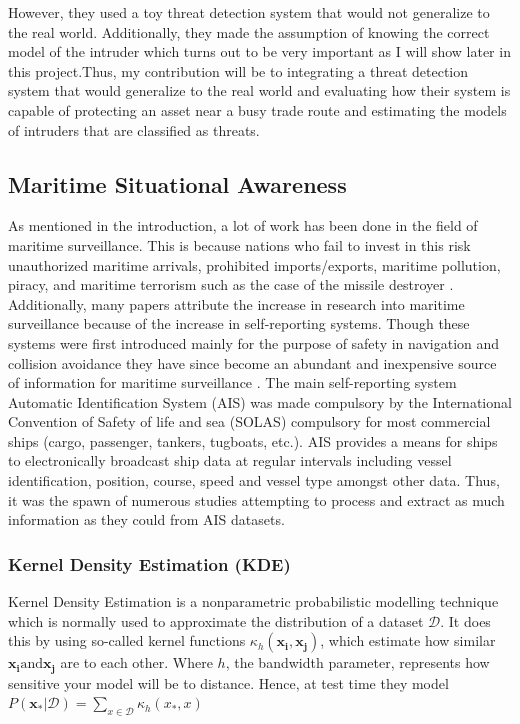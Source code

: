 \documentclass[bsc,frontabs,twoside,singlespacing,parskip,deptreport]{infthesis}     %
\begin{document}
However, they used a toy threat detection system that would not generalize to the real world. Additionally, they made the assumption of knowing the correct model of the intruder which turns out to be very important as I will show later in this project.Thus, my contribution will be to integrating a threat detection system that would generalize to the real world and evaluating how their system is capable of protecting an asset near a busy trade route and estimating the models of intruders that are classified as threats.

\subsection{Maritime Situational Awareness}
As mentioned in the introduction, a lot of work has been done in the field of maritime surveillance. This is because nations who fail to invest in this risk unauthorized maritime arrivals, prohibited imports/exports, maritime pollution, piracy, and maritime terrorism \cite{ristic2008statistical} such as the case of the missile destroyer \cite{combs2009encyclopedia}. Additionally, many papers attribute the increase in research into maritime surveillance because of the increase in self-reporting systems. Though these systems were first introduced mainly for the purpose of safety in navigation and collision avoidance they have since become an abundant and inexpensive source of information for maritime surveillance  \cite{kde}. The main self-reporting system Automatic Identification System (AIS) was made compulsory by the International Convention of Safety of life and sea (SOLAS) compulsory for most commercial ships (cargo, passenger, tankers, tugboats, etc.). AIS provides a means for ships to electronically broadcast ship data at regular intervals including vessel identification, position, course, speed and vessel type amongst other data. Thus, it was the spawn of numerous studies attempting to process and extract as much information as they could from AIS datasets. 

\subsubsection{Kernel Density Estimation (KDE)}
\label{sss:kde}
Kernel Density Estimation is a nonparametric probabilistic modelling technique which is normally used to approximate the distribution of a dataset $\mathcal{D}$. It does this by using so-called kernel functions $\kappa_h(\mathbf{x_i}, \mathbf{x_j})$, which estimate how similar $\mathbf{x_i} \text{and} \mathbf{x_j}$ are to each other. Where $h$, the bandwidth parameter, represents how sensitive your model will be to distance. Hence, at test time they model $P(\mathbf{x_*}|\mathcal{D}) = \sum_{x \in \mathcal{D}} \kappa_h(x_*, x)$
\end{document}
